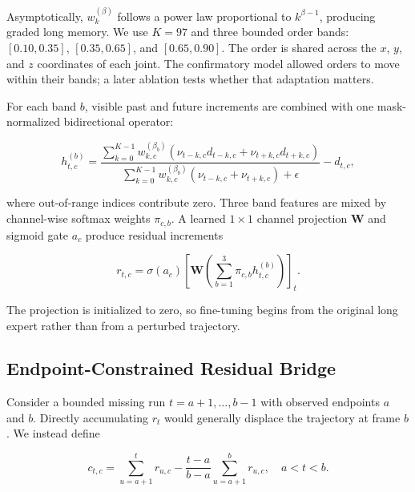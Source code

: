 \documentclass[fractalfract,article,submit,moreauthors,pdftex]{Definitions/mdpi}
\begin{document}
Asymptotically, $w_k^{(\beta)}$ follows a power law proportional to $k^{\beta-1}$, producing graded long memory. We use $K=97$ and three bounded order bands: $[0.10,0.35]$, $[0.35,0.65]$, and $[0.65,0.90]$. The order is shared across the $x$, $y$, and $z$ coordinates of each joint. The confirmatory model allowed orders to move within their bands; a later ablation tests whether that adaptation matters.

For each band $b$, visible past and future increments are combined with one mask-normalized bidirectional operator:

\begin{linenomath}
\begin{equation}
h^{(b)}_{t,c}=
\frac{\sum_{k=0}^{K-1}w^{(\beta_b)}_{k,c}
\left(\nu_{t-k,c}d_{t-k,c}+\nu_{t+k,c}d_{t+k,c}\right)}
{\sum_{k=0}^{K-1}w^{(\beta_b)}_{k,c}
\left(\nu_{t-k,c}+\nu_{t+k,c}\right)+\epsilon}-d_{t,c},
\label{eq:bidirectional_context}
\end{equation}
\end{linenomath}

where out-of-range indices contribute zero. Three band features are mixed by channel-wise softmax weights $\pi_{c,b}$. A learned $1\times1$ channel projection $\mathbf{W}$ and sigmoid gate $a_c$ produce residual increments

\begin{linenomath}
\begin{equation}
r_{t,c}=\sigma(a_c)\left[\mathbf{W}\left(\sum_{b=1}^{3}\pi_{c,b}h^{(b)}_{t,c}\right)\right]_t.
\label{eq:residual_increment}
\end{equation}
\end{linenomath}

The projection is initialized to zero, so fine-tuning begins from the original long expert rather than from a perturbed trajectory.

\subsection{Endpoint-Constrained Residual Bridge}

Consider a bounded missing run $t=a+1,\ldots,b-1$ with observed endpoints $a$ and $b$. Directly accumulating $r_t$ would generally displace the trajectory at frame $b$. We instead define

\begin{linenomath}
\begin{equation}
c_{t,c}=\sum_{u=a+1}^{t}r_{u,c}-\frac{t-a}{b-a}\sum_{u=a+1}^{b}r_{u,c},
\quad a<t<b.
\label{eq:endpoint_bridge}
\end{equation}
\end{linenomath}
\end{document}
